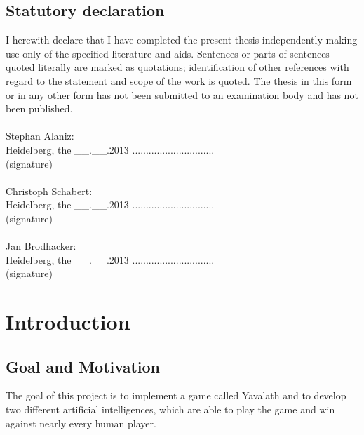 \documentclass[english]{report}
\begin{document}
\newpage
\section*{Statutory declaration}\thispagestyle{empty}
I herewith declare that I have completed the present thesis independently making use only of the specified literature and aids. Sentences or parts of sentences quoted literally are marked as quotations; identification of other references with regard to the statement and scope of the work is quoted. The thesis in this form or in any other form has not been submitted to an examination body and has not been published.\\
\\
Stephan Alaniz:\\
Heidelberg, the \_\_.\_\_.2013 \hspace{2.5cm} .............................. \\
\hspace*{6.5cm} (signature)\\
\\
Christoph Schabert:\\
Heidelberg, the \_\_.\_\_.2013 \hspace{2.5cm} .............................. \\
\hspace*{6.5cm} (signature)\\
\\
Jan Brodhacker:\\
Heidelberg, the \_\_.\_\_.2013 \hspace{2.5cm} .............................. \\
\hspace*{6.5cm} (signature)\\

\newpage
\setcounter{page}{1}



\tableofcontents

\listoffigures





\newpage

\chapter{Introduction}
\label{sec:chapter1}
\section{Goal and Motivation}
The goal of this project is to implement a game called Yavalath and to develop
two different artificial intelligences, which are able to play the game and win
against nearly every human player.
\end{document}
